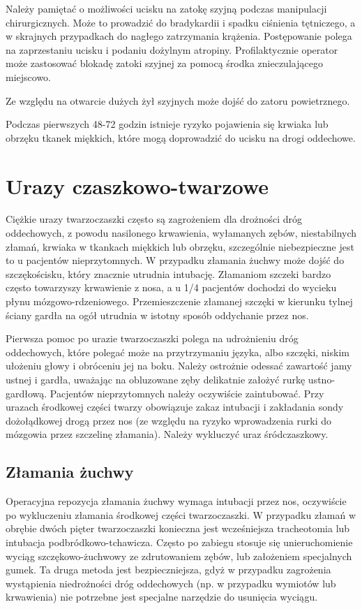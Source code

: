 \documentclass[a4paper, 12pt]{report}
\begin{document}
Należy pamiętać o możliwości ucisku na zatokę szyjną podczas
manipulacji chirurgicznych. Może to prowadzić do bradykardii i spadku
ciśnienia tętniczego, a w skrajnych przypadkach do nagłego zatrzymania
krążenia. Postępowanie polega na zaprzestaniu ucisku i podaniu
dożylnym atropiny. Profilaktycznie operator może zastosować blokadę
zatoki szyjnej za pomocą środka znieczulającego miejscowo.

Ze względu na otwarcie dużych żył szyjnych może dojść do zatoru
powietrznego.

Podczas pierwszych 48-72 godzin istnieje ryzyko pojawienia się krwiaka
lub obrzęku tkanek miękkich, które mogą doprowadzić do ucisku na drogi
oddechowe.

\section{Urazy czaszkowo-twarzowe}

Ciężkie urazy twarzoczaszki często są zagrożeniem dla drożności dróg
oddechowych, z powodu nasilonego krwawienia, wyłamanych zębów,
niestabilnych złamań, krwiaka w tkankach miękkich lub obrzęku,
szczególnie niebezpieczne jest to u pacjentów nieprzytomnych. W
przypadku złamania żuchwy może dojść do szczękościsku, który znacznie
utrudnia intubację. Złamaniom szczeki bardzo często towarzyszy
krwawienie z nosa, a u 1/4 pacjentów dochodzi do wycieku płynu
mózgowo-rdzeniowego. Przemieszczenie złamanej szczęki w kierunku
tylnej ściany gardła na ogół utrudnia w istotny sposób oddychanie
przez nos.

Pierwsza pomoc po urazie twarzoczaszki polega na udrożnieniu dróg
oddechowych, które polegać może na przytrzymaniu języka, albo szczęki,
niskim ułożeniu głowy i obróceniu jej na boku. Należy ostrożnie
odessać zawartość jamy ustnej i gardła, uważając na obluzowane zęby
delikatnie założyć rurkę ustno-gardłową. Pacjentów nieprzytomnych
należy oczywiście zaintubować. Przy urazach środkowej części twarzy
obowiązuje zakaz intubacji i zakładania sondy dożołądkowej drogą przez
nos (ze względu na ryzyko wprowadzenia rurki do mózgowia przez
szczelinę złamania). Należy wykluczyć uraz śródczaszkowy.

\subsection{Złamania żuchwy}

Operacyjna repozycja złamania żuchwy wymaga intubacji przez nos,
oczywiście po wykluczeniu złamania środkowej części twarzoczaszki. W
przypadku złamań w obrębie dwóch pięter twarzoczaszki konieczna jest
wcześniejsza tracheotomia lub intubacja podbródkowo-tchawicza. Często
po zabiegu stosuje się unieruchomienie wyciąg szczękowo-żuchwowy ze
zdrutowaniem zębów, lub założeniem specjalnych gumek. Ta druga metoda
jest bezpieczniejsza, gdyż w przypadku zagrożenia wystąpienia
niedrożności dróg oddechowych (np. w przypadku wymiotów lub
krwawienia) nie potrzebne jest specjalne narzędzie do usunięcia
wyciągu.
\end{document}
